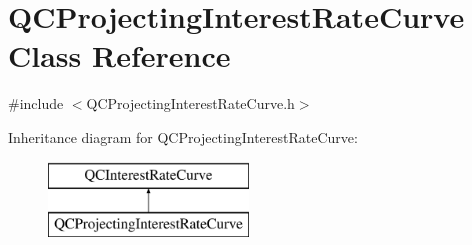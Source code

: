 \hypertarget{class_q_c_projecting_interest_rate_curve}{\section{Q\+C\+Projecting\+Interest\+Rate\+Curve Class Reference}
\label{class_q_c_projecting_interest_rate_curve}
}


{\ttfamily \#include $<$Q\+C\+Projecting\+Interest\+Rate\+Curve.\+h$>$}

Inheritance diagram for Q\+C\+Projecting\+Interest\+Rate\+Curve\+:\begin{figure}[H]
\begin{center}
\leavevmode
\includegraphics[height=2.000000cm]{class_q_c_projecting_interest_rate_curve}
\end{center}
\end{figure}

